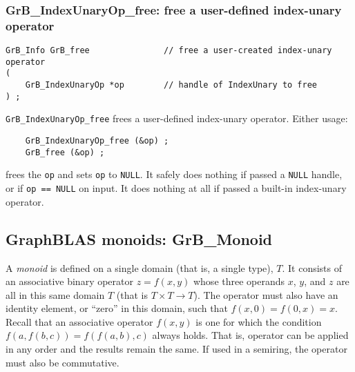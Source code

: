 \documentclass[12pt]{article}
\begin{document}
{%
\subsubsection{{\sf GrB\_IndexUnaryOp\_free:} free a user-defined index-unary operator}
\label{idxunop_free}

\begin{mdframed}[userdefinedwidth=6in]
{\footnotesize
\begin{verbatim}
GrB_Info GrB_free               // free a user-created index-unary operator
(
    GrB_IndexUnaryOp *op        // handle of IndexUnary to free
) ;
\end{verbatim}
}\end{mdframed}

\verb'GrB_IndexUnaryOp_free' frees a user-defined index-unary operator.  Either usage:

    {\small
    \begin{verbatim}
    GrB_IndexUnaryOp_free (&op) ;
    GrB_free (&op) ; \end{verbatim}}

\noindent
frees the \verb'op' and sets \verb'op' to \verb'NULL'.  It safely
does nothing if passed a \verb'NULL' handle, or if \verb'op == NULL' on
input.  It does nothing at all if passed a built-in index-unary operator.


\newpage
\subsection{GraphBLAS monoids: {\sf GrB\_Monoid}} %
\label{monoid}

A {\em monoid} is defined on a single domain (that is, a single type), $T$.  It
consists of an associative binary operator $z=f(x,y)$ whose three operands $x$,
$y$, and $z$ are all in this same domain $T$ (that is $T \times T \rightarrow
T$).  The operator must also have an identity element, or ``zero'' in this
domain, such that $f(x,0)=f(0,x)=x$.  Recall that an associative operator
$f(x,y)$ is one for which the condition $f(a, f(b,c)) = f(f (a,b),c)$ always
holds.  That is, operator can be applied in any order and the results remain
the same.  If used in a semiring, the operator must also be commutative.

}
\end{document}
